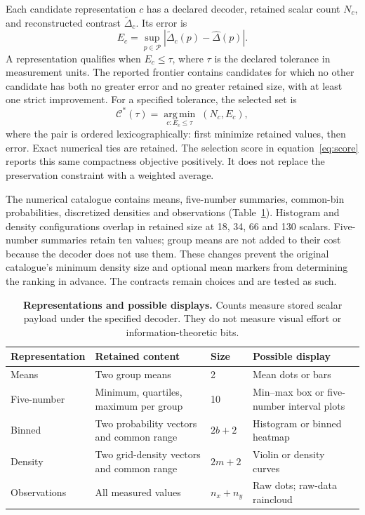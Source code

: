 \documentclass[11pt]{article}
\begin{document}
Each candidate representation $c$ has a declared decoder, retained scalar count $N_c$, and reconstructed contrast $\widetilde\Delta_c$. Its error is
\begin{equation}\label{eq:error}
E_c=\sup_{p\in\mathcal P}|\widetilde\Delta_c(p)-\widehat\Delta(p)|.
\end{equation}
A representation qualifies when $E_c\leq\tau$, where $\tau$ is the declared tolerance in measurement units. The reported frontier contains candidates for which no other candidate has both no greater error and no greater retained size, with at least one strict improvement. For a specified tolerance, the selected set is
\begin{equation}\label{eq:selection}
\mathcal C^*(\tau)=\underset{c:E_c\leq\tau}{\operatorname{arg\,min}}\;(N_c,E_c),
\end{equation}
where the pair is ordered lexicographically: first minimize retained values, then error. Exact numerical ties are retained. The selection score in equation~\ref{eq:score} reports this same compactness objective positively. It does not replace the preservation constraint with a weighted average.

The numerical catalogue contains means, five-number summaries, common-bin probabilities, discretized densities and observations (Table~\ref{tab:contracts}). Histogram and density configurations overlap in retained size at 18, 34, 66 and 130 scalars. Five-number summaries retain ten values; group means are not added to their cost because the decoder does not use them. These changes prevent the original catalogue's minimum density size and optional mean markers from determining the ranking in advance. The contracts remain choices and are tested as such.

\begin{table}[ht]\centering\small
\caption{\textbf{Representations and possible displays.} Counts measure stored scalar payload under the specified decoder. They do not measure visual effort or information-theoretic bits.}\label{tab:contracts}
\begin{tabular}{p{2.3cm}p{4.5cm}p{1.9cm}p{4.8cm}}\toprule
Representation & Retained content & Size & Possible display\\\midrule
Means & Two group means & 2 & Mean dots or bars\\
Five-number & Minimum, quartiles, maximum per group & 10 & Min--max box or five-number interval plots\\
Binned & Two probability vectors and common range & $2b+2$ & Histogram or binned heatmap\\
Density & Two grid-density vectors and common range & $2m+2$ & Violin or density curves\\
Observations & All measured values & $n_x+n_y$ & Raw dots; raw-data raincloud\\\bottomrule
\end{tabular}
\end{table}
\end{document}

